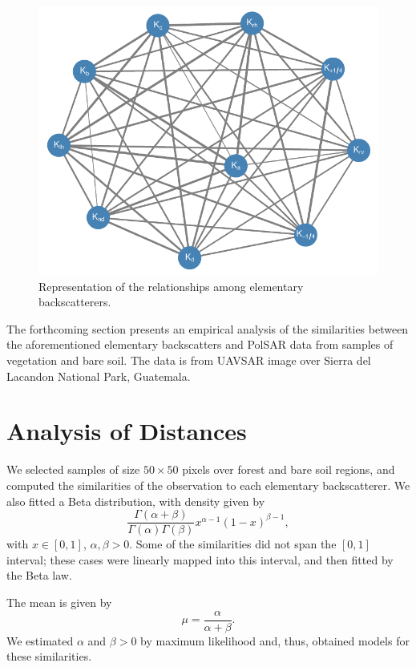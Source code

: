\documentclass[conference]{IEEEtran}
\begin{document}
\begin{figure}[hbt]
\centering
\includegraphics[width=.95\linewidth]{network}
\caption{Representation of the relationships among elementary backscatterers.}\label{fig:Network}
\end{figure}

The forthcoming section presents an empirical analysis of the similarities between the aforementioned elementary backscatters and PolSAR data from samples of vegetation and bare soil. 
The data is from UAVSAR image over Sierra del Lacandon National Park, Guatemala.

\section{Analysis of Distances}

We selected samples of size $50\times 50$ pixels over forest and bare soil regions, and computed the similarities of the observation to each elementary backscatterer.
We also fitted a Beta distribution, with density given by
$$
\frac{\Gamma(\alpha+\beta)}{\Gamma(\alpha)\Gamma(\beta)}x^{\alpha-1}(1-x)^{\beta-1},
$$
with $x \in [ 0,1]$, $\alpha,\beta>0$.
Some of the similarities did not span the $[0,1]$ interval;
these cases were linearly mapped into this interval, and then fitted by the Beta law.

The mean is given by
\begin{equation}
  \mu = \frac{\alpha}{\alpha + \beta}.
  \label{eq:MeanBeta}
\end{equation}
We estimated $\alpha$ and $\beta>0$ by maximum likelihood and, thus, obtained models for these similarities.
\end{document}
